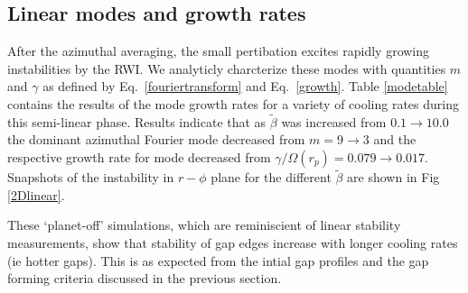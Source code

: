 \subsection{Linear modes and growth rates}\label{linear}
After the azimuthal averaging, the small pertibation excites rapidly growing instabilities by the RWI. We analyticly charcterize these modes with quantities $m$ and $\gamma$ as defined by Eq.~\ref{fouriertransform} and Eq.~\ref{growth}. Table \ref{modetable} contains the results of the mode growth rates for a variety of cooling rates during this semi-linear phase. Results indicate that as $\tilde{\beta}$ was increased from $ 0.1\rightarrow10.0$ the dominant azimuthal Fourier mode decreased from $ m=9\rightarrow3$ and the respective growth rate for mode decreased from $ \gamma/\Omega(r_p)=0.079 \rightarrow 0.017$. Snapshots of the instability in $r-\phi$ plane for the different $\tilde\beta$ are shown in Fig \ref{2Dlinear}.

These `planet-off' simulations, which are reminiscient of linear stability measurements, show that stability of gap edges increase with longer cooling rates (ie hotter gaps). This is as expected from the intial gap profiles and the gap forming criteria discussed in the previous section.

